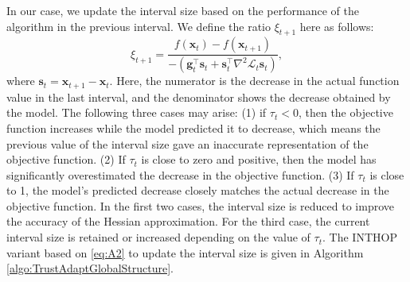 \documentclass{elsarticle}
\numberwithin{equation}{section}
\begin{document}
In our case, we update the interval size based on the performance of the algorithm in the previous interval. We define the ratio $\xi_{t+1}$ here as follows:
\begin{equation}\label{eq:A2}
    \xi_{t+1} = \frac{f(\mathbf{x}_{t}) - f(\mathbf{x}_{t+1})}{-(\mathbf{g}_t^\top \mathbf{s}_t + \mathbf{s}_t^\top \nabla^2 \mathcal{L}_{t}\mathbf{s}_t)},
\end{equation}
where $\mathbf{s}_t = \mathbf{x}_{t+1} - \mathbf{x}_t$. Here, the numerator is the decrease in the actual function value in the last interval, and the denominator shows the decrease obtained by the model. The following three cases may arise: (1) if $\tau_t < 0$, then the objective function increases while the model predicted it to decrease, which means the previous value of the interval size gave an inaccurate representation of the objective function. (2) If $\tau_t$ is close to zero and positive, then the model has significantly overestimated the decrease in the objective function. (3) If \( \tau_t \) is close to 1, the model's predicted decrease closely matches the actual decrease in the objective function. In the first two cases, the interval size is reduced to improve the accuracy of the Hessian approximation. For the third case, the current interval size is retained or increased depending on the value of $\tau_t$. The INTHOP variant based on \eqref{eq:A2} to update the interval size is given in Algorithm \ref{algo:TrustAdaptGlobalStructure}. 
\end{document}
